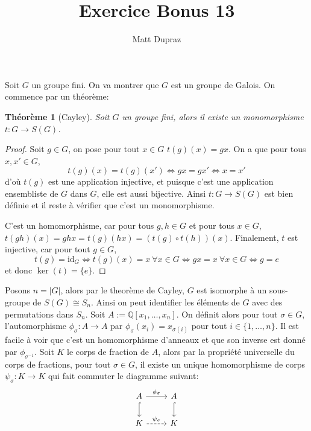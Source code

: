 \documentclass[french]{article}
\title{Exercice Bonus 13}
\author{Matt Dupraz}
\newtheorem*{theorem}{Théorème}
\newcommand{\Q}{\mathbb{Q}}
\newcommand{\id}{\mathrm{id}}
\begin{document}
\maketitle

Soit $G$ un groupe fini. On va montrer que $G$ est un groupe
de Galois. On commence par un théorème:

\begin{theorem}[Cayley]
	Soit $G$ un groupe fini, alors il existe un monomorphisme
	$t: G \to S(G)$.
\end{theorem}
\begin{proof}
	Soit $g \in G$, on pose pour tout $x \in G$ 
	$t(g)(x) = gx$. On a que pour tous $x, x' \in G$,
	\begin{equation*}
		t(g)(x) = t(g)(x') \iff gx = gx' \iff x = x'
	\end{equation*}
	d'où $t(g)$ est une application injective, et puisque c'est une
	application ensembliste de $G$ dans $G$, elle est aussi
	bijective.
	Ainsi $t: G \to S(G)$ est bien définie et il reste à vérifier
	que c'est un monomorphisme.

	C'est un homomorphisme, car pour tous $g, h \in G$ et pour
	tous $x \in G$, $t(gh)(x) = ghx = t(g)(hx)
	= (t(g)\circ t(h))(x)$. Finalement, $t$ est injective, car
	pour tout $g \in G$,
	\begin{equation*}
		t(g) = \id_G \iff t(g)(x) = x ~\forall x \in G
			\iff gx = x ~\forall x \in G \iff g = e
	\end{equation*}
	et donc $\ker(t) = \{e\}$.
\end{proof}

Posons $n = |G|$, alors par le theorème de Cayley,
$G$ est isomorphe à un sous-groupe de $S(G) \cong S_n$.
Ainsi on peut 
identifier les éléments de $G$ avec des permutations dans $S_n$.
Soit $A := \Q[x_1, \dots, x_n]$.
On définit alors pour tout $\sigma \in G$, l'automorphisme 
$\phi_\sigma : A \to A$
par $\phi_\sigma(x_i) = x_{\sigma(i)}$ pour tout
$i \in \{1, \dots, n\}$. Il est facile à voir que c'est un
homomorphisme d'anneaux et que son inverse est donné par
$\phi_{\sigma^{-1}}$.
Soit $K$ le corps de fraction de $A$, alors par
la propriété universelle du corps de fractions, pour tout
$\sigma \in G$, il existe un unique homomorphisme de corps
$\psi_\sigma: K \to K$
qui fait commuter
le diagramme suivant:
\begin{equation*}
\begin{tikzcd}
A \arrow[r, "\phi_\sigma"] \arrow[d, hook] & A \arrow[d, hook] \\
K \arrow[r, "\psi_\sigma", dashed]         & K                
\end{tikzcd}
\end{equation*}
\end{document}
